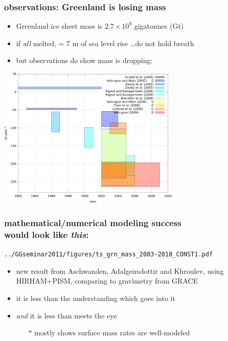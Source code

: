 \documentclass{beamer}
\begin{document}
\begin{frame}
  \frametitle{observations: Greenland is losing mass}

\begin{itemize}
\item Greenland ice sheet mass is $2.7 \times 10^9$ gigatonnes (Gt) %
\item if \emph{all} melted, = 7 m of sea level rise \dots do not hold breath
\item but observations do show mass is dropping:
\end{itemize}
\medskip

\begin{center}
    \includegraphics[width=0.65\textwidth]{greenlandboxes}
\end{center}
\end{frame}


\begin{frame}
  \frametitle{mathematical/numerical modeling success \\ would look like \emph{this}:}

\vspace{-0.2cm}
\begin{center}
    \texttt{../GGseminar2011/figures/ts\_grn\_mass\_2003-2010\_CONST1.pdf}
\end{center}

\vspace{-0.4cm}
\begin{itemize}
\small
  \item new result from Aschwanden, Adalgeirsdottir and Khroulev, using HIRHAM+PISM, comparing to gravimetry from GRACE
  \item it is less than the understanding which goes into it
  \item \emph{and} it is less than meets the eye
    \begin{itemize}
    \item[$\ast$] mostly shows surface mass rates are well-modeled
    \end{itemize}
\end{itemize}
\end{frame}
\end{document}
